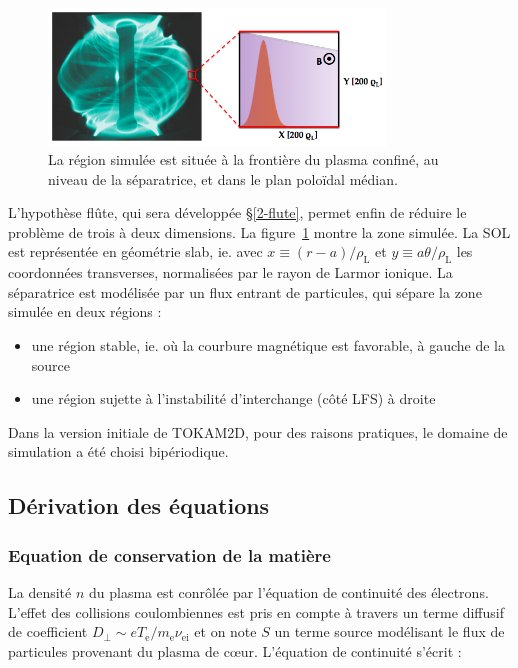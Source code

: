 \begin{refsection}
\begin{figure}[htbp]
\centering
    \includegraphics[width=0.8\textwidth]{figures/2-tokamSimDomain.png}
    \caption{La région simulée est située à la frontière du plasma confiné,
    au niveau de la séparatrice, et dans le plan poloïdal médian.}
    \label{2-figTokamGeom}
\end{figure}

L'hypothèse flûte, qui sera développée §\ref{2-flute}, permet enfin de réduire
le problème de trois à deux dimensions.
La figure~\ref{2-figTokamGeom} montre la zone simulée. La SOL est représentée
en géométrie slab, ie. avec $x\equiv(r-a)/\rho_\text{L}$ et $y\equiv
a\theta/\rho_\text{L}$ les coordonnées transverses, normalisées par le rayon
de Larmor ionique. La séparatrice est modélisée par un flux entrant de particules,
qui sépare la zone simulée en deux régions :

\begin{itemize}
  \item une région stable, ie. où la courbure magnétique est favorable, à gauche
  de la source
  \item une région sujette à l'instabilité d'interchange (côté LFS) à droite
 \end{itemize}
 
Dans la version initiale de TOKAM2D, pour des raisons pratiques, le domaine de
simulation a été choisi bipériodique. 

\subsection{Dérivation des équations}
\subsubsection{Equation de conservation de la matière}
La densité $n$ du plasma est conrôlée par l'équation de continuité des
électrons. L'effet des collisions coulombiennes est pris en compte à travers un
terme diffusif de coefficient $D_\perp\sim eT_\text{e}/m_\text{e}\nu_\text{ei}$
et on note $S$ un terme source modélisant le flux de particules
provenant du plasma de c\oe{}ur. L'équation de continuité s'écrit :


\end{refsection}
